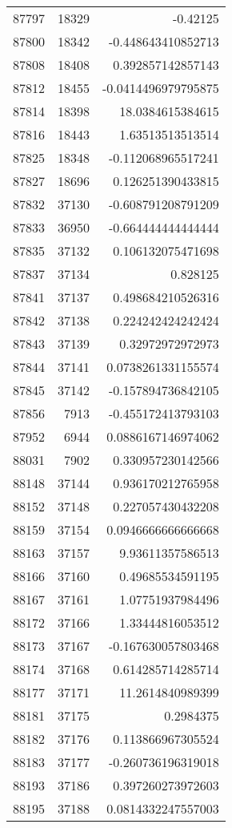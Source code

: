 \begin{tabular}{r | r | r}
87797 & 18329 & -0.42125 \\
87800 & 18342 & -0.448643410852713 \\
87808 & 18408 & 0.392857142857143 \\
87812 & 18455 & -0.0414496979795875 \\
87814 & 18398 & 18.0384615384615 \\
87816 & 18443 & 1.63513513513514 \\
87825 & 18348 & -0.112068965517241 \\
87827 & 18696 & 0.126251390433815 \\
87832 & 37130 & -0.608791208791209 \\
87833 & 36950 & -0.664444444444444 \\
87835 & 37132 & 0.106132075471698 \\
87837 & 37134 & 0.828125 \\
87841 & 37137 & 0.498684210526316 \\
87842 & 37138 & 0.224242424242424 \\
87843 & 37139 & 0.32972972972973 \\
87844 & 37141 & 0.0738261331155574 \\
87845 & 37142 & -0.157894736842105 \\
87856 & 7913 & -0.455172413793103 \\
87952 & 6944 & 0.0886167146974062 \\
88031 & 7902 & 0.330957230142566 \\
88148 & 37144 & 0.936170212765958 \\
88152 & 37148 & 0.227057430432208 \\
88159 & 37154 & 0.0946666666666668 \\
88163 & 37157 & 9.93611357586513 \\
88166 & 37160 & 0.49685534591195 \\
88167 & 37161 & 1.07751937984496 \\
88172 & 37166 & 1.33444816053512 \\
88173 & 37167 & -0.167630057803468 \\
88174 & 37168 & 0.614285714285714 \\
88177 & 37171 & 11.2614840989399 \\
88181 & 37175 & 0.2984375 \\
88182 & 37176 & 0.113866967305524 \\
88183 & 37177 & -0.260736196319018 \\
88193 & 37186 & 0.397260273972603 \\
88195 & 37188 & 0.0814332247557003 \\

\end{tabular}

